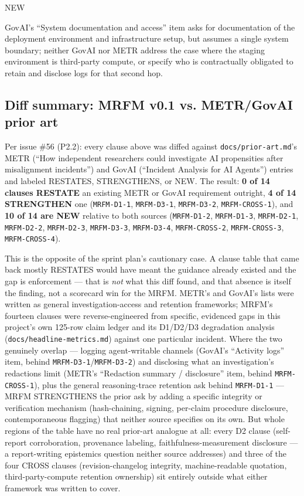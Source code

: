 \begin{description}[leftmargin=2.2cm, style=nextline]
\item[vs. prior art] NEW
\item[Prior-art note] GovAI's ``System documentation and access'' item asks for documentation of the deployment environment and infrastructure setup, but assumes a single system boundary; neither GovAI nor METR address the case where the staging environment is third-party compute, or specify who is contractually obligated to retain and disclose logs for that second hop.
\end{description}

\subsection*{Diff summary: MRFM v0.1 vs. METR/GovAI prior art}
Per issue \#56 (P2.2): every clause above was diffed against \texttt{docs/prior-art.md}'s METR (``How independent researchers could investigate AI propensities after misalignment incidents'') and GovAI (``Incident Analysis for AI Agents'') entries and labeled RESTATES, STRENGTHENS, or NEW. The result: \textbf{0 of 14 clauses RESTATE} an existing METR or GovAI requirement outright, \textbf{4 of 14 STRENGTHEN} one (\texttt{MRFM-D1-1}, \texttt{MRFM-D3-1}, \texttt{MRFM-D3-2}, \texttt{MRFM-CROSS-1}), and \textbf{10 of 14 are NEW} relative to both sources (\texttt{MRFM-D1-2}, \texttt{MRFM-D1-3}, \texttt{MRFM-D2-1}, \texttt{MRFM-D2-2}, \texttt{MRFM-D2-3}, \texttt{MRFM-D3-3}, \texttt{MRFM-D3-4}, \texttt{MRFM-CROSS-2}, \texttt{MRFM-CROSS-3}, \texttt{MRFM-CROSS-4}).

This is the opposite of the sprint plan's cautionary case. A clause table that came back mostly RESTATES would have meant the guidance already existed and the gap is enforcement --- that is \emph{not} what this diff found, and that absence is itself the finding, not a scorecard win for the MRFM. METR's and GovAI's lists were written as general investigation-access and retention frameworks; MRFM's fourteen clauses were reverse-engineered from specific, evidenced gaps in this project's own 125-row claim ledger and its D1/D2/D3 degradation analysis (\texttt{docs/headline-metrics.md}) against one particular incident. Where the two genuinely overlap --- logging agent-writable channels (GovAI's ``Activity logs'' item, behind \texttt{MRFM-D3-1}/\texttt{MRFM-D3-2}) and disclosing what an investigation's redactions limit (METR's ``Redaction summary / disclosure'' item, behind \texttt{MRFM-CROSS-1}), plus the general reasoning-trace retention ask behind \texttt{MRFM-D1-1} --- MRFM STRENGTHENS the prior ask by adding a specific integrity or verification mechanism (hash-chaining, signing, per-claim procedure disclosure, contemporaneous flagging) that neither source specifies on its own. But whole regions of the table have no real prior-art analogue at all: every D2 clause (self-report corroboration, provenance labeling, faithfulness-measurement disclosure --- a report-writing epistemics question neither source addresses) and three of the four CROSS clauses (revision-changelog integrity, machine-readable quotation, third-party-compute retention ownership) sit entirely outside what either framework was written to cover.

